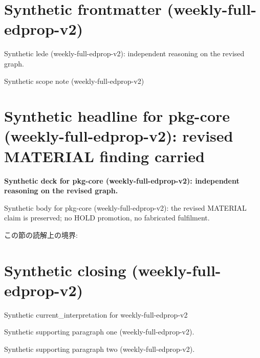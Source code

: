 \documentclass[lualatex,a4paper,10pt]{jlreq}
\begin{document}
\surveycover
\clearpage
\section*{Synthetic frontmatter (weekly-full-edprop-v2)}
Synthetic lede (weekly-full-edprop-v2): independent reasoning on the revised graph.

\begin{claimboundary}
\noindent Synthetic scope note (weekly-full-edprop-v2)\par
\end{claimboundary}
\clearpage
\twocolumn
\section{Synthetic headline for pkg-core (weekly-full-edprop-v2): revised MATERIAL finding carried}
\label{pkg:pkg-core}
\noindent\textbf{Synthetic deck for pkg-core (weekly-full-edprop-v2): independent reasoning on the revised graph.} \cite{w2026-W33target-source}\par\medskip
\noindent Synthetic body for pkg-core (weekly-full-edprop-v2): the revised MATERIAL claim is preserved; no HOLD promotion, no fabricated fulfilment.\par\medskip
\begin{claimboundary}
この節の読解上の境界: 
\end{claimboundary}
\clearpage
\onecolumn
\section{Synthetic closing (weekly-full-edprop-v2)}
\label{sec:issue-summary}
\noindent Synthetic current\_interpretation for weekly-full-edprop-v2\par\medskip
\noindent Synthetic supporting paragraph one (weekly-full-edprop-v2).\par\medskip
\noindent Synthetic supporting paragraph two (weekly-full-edprop-v2).\par\medskip
\clearpage
\onecolumn
\printbibliography[title={References / Source Notes}]
\end{document}
